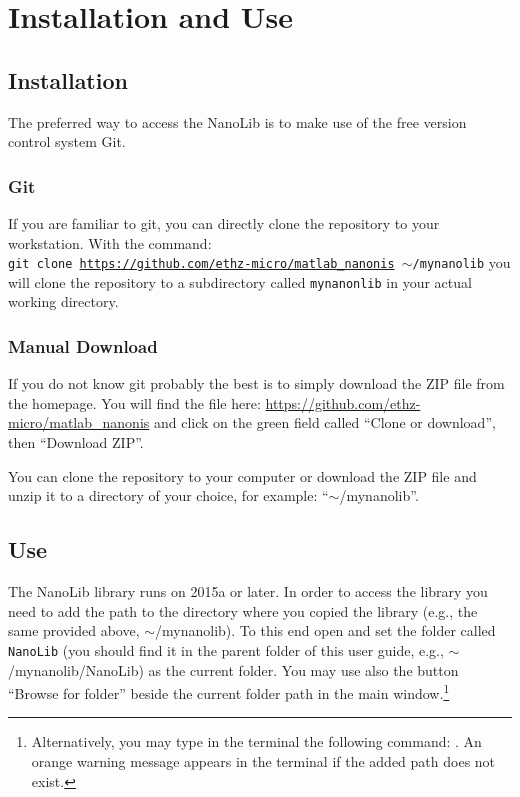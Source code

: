 \section{Installation and Use}

\subsection{Installation}

The preferred way to access the NanoLib is to make use of the free version control system Git.

\subsubsection{Git} \label{git-install}
If you are familiar to git, you can directly clone the repository to your workstation. With the command: \\
\texttt{git clone \url{https://github.com/ethz-micro/matlab_nanonis} $\sim$/mynanolib} you will clone the repository to a subdirectory called \texttt{mynanonlib} in your actual working directory.

\subsubsection{Manual Download} \label{man-install}
If you do not know git probably the best is to simply download the ZIP file from the homepage. You will find the file here: \url{https://github.com/ethz-micro/matlab_nanonis} and click on the green field called ``Clone or download'', then ``Download ZIP''.

You can clone the repository to your computer or download the ZIP file and unzip it to a directory of your choice, for example: ``$\sim$/mynanolib''.


\subsection{Use}

The NanoLib library runs on \matlab{} 2015a or later. 
In order to access the library you need to add the path to the directory where you copied the library (e.g., the same provided above, $\sim$/mynanolib).
To this end open \matlab{} and set the folder called \texttt{NanoLib} (you should find it in the parent folder of this user guide, e.g., $\sim$/mynanolib/NanoLib) as the \matlab{} current folder.
You may use also the button ``Browse for folder'' beside the current folder path in the \matlab{} main window.\footnote{Alternatively, you may type in the \matlab{} terminal the following command: .
An orange warning message appears in the \matlab{} terminal if the added path does not exist.}

